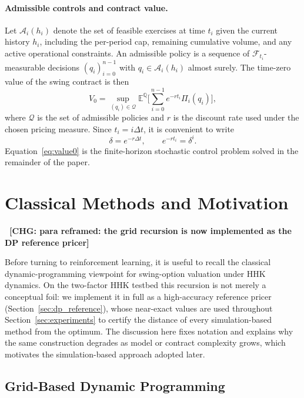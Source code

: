 \documentclass[a4paper,fleqn]{cas-dc}
\newcommand{\hlblock}[1]{\par\noindent
    \colorbox{chgyellow}{\parbox{\dimexpr\linewidth-2\fboxsep\relax}{#1}}\par}
\newcommand{\hlblock}[1]{#1}
\newcommand{\chg}[1]{{\normalfont\bfseries\color{red}~[CHG: \textsf{\footnotesize #1}]~}}
\newcommand{\chg}[1]{}
\begin{document}
\paragraph{Admissible controls and contract value.}
Let $\mathcal{A}_i(h_i)$ denote the set of feasible exercises at time $t_i$ given the current history $h_i$, including the per-period cap, remaining cumulative volume, and any active operational constraints. An admissible policy is a sequence of $\mathcal{F}_{t_i}$-measurable decisions $(q_i)_{i=0}^{n-1}$ with $q_i \in \mathcal{A}_i(h_i)$ almost surely. The time-zero value of the swing contract is then
\begin{equation}
    \label{eq:value0}
    V_0 = \sup_{(q_i) \in \mathcal{Q}}
    \mathbb{E}^{\mathbb{Q}}
    \biggl[
        \sum_{i=0}^{n-1} e^{-r t_i} \Pi_i(q_i)
        \biggr],
\end{equation}
where $\mathcal{Q}$ is the set of admissible policies and $r$ is the discount rate used under the chosen pricing measure. Since $t_i = i \Delta t$, it is convenient to write
\[
    \delta = e^{-r \Delta t},
    \qquad
    e^{-r t_i} = \delta^i.
\]
Equation~\eqref{eq:value0} is the finite-horizon stochastic control problem solved in the remainder of the paper.

\section{Classical Methods and Motivation}
\label{sec:classical_methods}

\chg{para reframed: the grid recursion is now implemented as the DP reference pricer}%
\hlblock{Before turning to reinforcement learning, it is useful to recall the classical dynamic-programming viewpoint for swing-option valuation under HHK dynamics. On the two-factor HHK testbed this recursion is not merely a conceptual foil: we implement it in full as a high-accuracy reference pricer (Section~\ref{sec:dp_reference}), whose near-exact values are used throughout Section~\ref{sec:experiments} to certify the distance of every simulation-based method from the optimum. The discussion here fixes notation and explains why the same construction degrades as model or contract complexity grows, which motivates the simulation-based approach adopted later.}

\subsection{Grid-Based Dynamic Programming}
\end{document}
